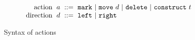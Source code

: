 \begin{figure}
  \vspace{-3px}
  \[
  \arraycolsep=3pt\begin{array}{rlrl}
      \text{action} & \action & ::= &
        \actionlit{mark} ~\vert~
        \actionlit{move}~\direction ~\vert~
        \actionlit{delete} ~\vert~
        \actionlit{construct}~\tile \\
      \text{direction} & \direction & ::= &
        \texttt{left} ~\vert~
        \texttt{right}
  \end{array}\]
  \caption{Syntax of actions}
  \label{fig:action-syntax}
\end{figure}
